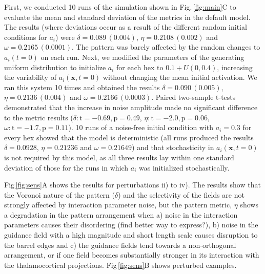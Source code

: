 \documentclass[9pt,lineno]{elife}
\newcommand{\sensitivity}[1]{\textcolor{revgblack}{#1}}
\newcommand{\mb}[1]{\mathbf{#1}}
\begin{document}
\sensitivity{First, we conducted 10 runs of the simulation shown in
  Fig.\,\ref{fig:main}C to evaluate the mean and standard deviation of the
  metrics in the default model. The results (where deviations occur as a
  result of the different random initial conditions for $a_i$) were
  $\delta=0.089\,(0.004)$, $\eta=0.2108\,(0.002)$ and
  $\omega=0.2165\,(0.0001)$. The pattern was barely affected by the random
  changes to $a_i(t=0)$ on each run.}
%
\sensitivity{Next, we modified the parameters of the generating uniform
  distribution to initialize $a_i$ for each hex to $0.1+{U}(0,0.4)$,
  increasing the variability of $a_i(\mb{x},t=0)$ without changing the mean
  initial activation. We ran this system 10 times and obtained the results
  $\delta=0.090\,(0.005)$, $\eta=0.2136\,(0.004)$ and
  $\omega=0.2166\,(0.0003)$. Paired two-sample t-tests demonstrated that the
  increase in noise amplitude made no significant difference to the metric
  results ($\delta: \mathrm{t}=-0.69,\mathrm{p}=0.49$, $\eta:
  \mathrm{t}=-2.0,\mathrm{p}=0.06$, $\omega:
  \mathrm{t}=-1.7,\mathrm{p}=0.11$). 10 runs of a noise-free initial condition
  with $a_i=0.3$ for every hex showed that the model is deterministic (all
  runs produced the results $\delta=0.0928$, $\eta=0.21236$ and
  $\omega=0.21649$) and that stochasticity in $a_i(\mb{x},t=0)$ is not
  required by this model, as all three results lay within one standard
  deviation of those for the runs in which $a_i$ was initialized
  stochastically.}


\sensitivity{Fig\,\ref{fig:sens}A shows the results for perturbations ii) to
  iv). The results show that the Voronoi nature of the pattern ($\delta$) and
  the selectivity of the fields are not strongly affected by interaction
  parameter noise, but the pattern metric, $\eta$ shows a degradation in the
  pattern arrangement when a) noise in the interaction parameters causes their
  disordering (find better way to express?), b) noise in the guidance field
  with a high magnitude and short length scale causes disruption to the barrel
  edges and c) the guidance fields tend towards a non-orthogonal arrangement,
  or if one field becomes substantially stronger in its interaction with the
  thalamocortical projections. Fig\,\ref{fig:sens}B shows perturbed examples.}
\end{document}
